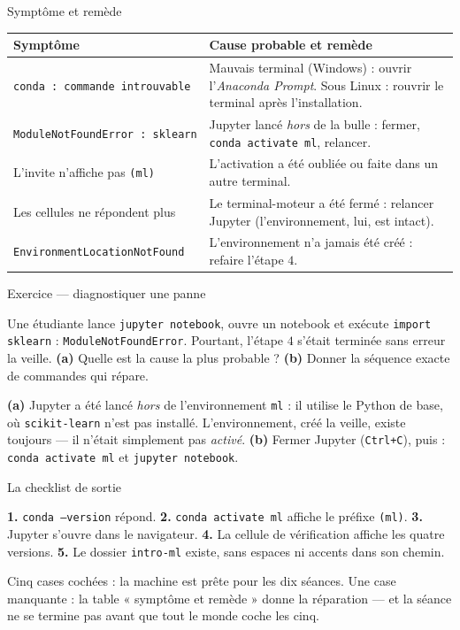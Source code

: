 \documentclass[aspectratio=169,11pt]{beamer}
\begin{document}
\begin{frame}{Symptôme et remède}
\begin{center}\small \renewcommand{\arraystretch}{1.3}
\begin{tabular}{p{5.4cm} p{6.6cm}}
\textbf{Symptôme} & \textbf{Cause probable et remède}\\\hline
\texttt{conda~:~commande introuvable} & Mauvais terminal (Windows) : ouvrir l'\emph{Anaconda Prompt}. Sous Linux : rouvrir le terminal après l'installation.\\
\texttt{ModuleNotFoundError~:~sklearn} & Jupyter lancé \emph{hors} de la bulle : fermer, \texttt{conda activate ml}, relancer.\\
L'invite n'affiche pas \texttt{(ml)} & L'activation a été oubliée ou faite dans un autre terminal.\\
Les cellules ne répondent plus & Le terminal-moteur a été fermé : relancer Jupyter (l'environnement, lui, est intact).\\
\texttt{EnvironmentLocationNotFound} & L'environnement n'a jamais été créé : refaire l'étape $4$.\\
\end{tabular}\end{center}
\end{frame}

\begin{frame}{Exercice — diagnostiquer une panne}
\begin{ucadrec}[Énoncé]
{\small Une étudiante lance \texttt{jupyter notebook}, ouvre un notebook et exécute \texttt{import sklearn} : \texttt{ModuleNotFoundError}. Pourtant, l'étape $4$ s'était terminée sans erreur la veille. \textbf{(a)} Quelle est la cause la plus probable ? \textbf{(b)} Donner la séquence exacte de commandes qui répare.}
\end{ucadrec}
\pause
\begin{ucadex}[Correction]
{\small \textbf{(a)} Jupyter a été lancé \emph{hors} de l'environnement \texttt{ml} : il utilise le Python de base, où \texttt{scikit-learn} n'est pas installé. L'environnement, créé la veille, existe toujours — il n'était simplement pas \emph{activé}. \textbf{(b)} Fermer Jupyter (\texttt{Ctrl+C}), puis : \texttt{conda activate ml} et \texttt{jupyter notebook}.}
\end{ucadex}
\end{frame}

\begin{frame}{La checklist de sortie}
\begin{ucadret}
{\small \textbf{1.} \texttt{conda --version} répond. \;\textbf{2.} \texttt{conda activate ml} affiche le préfixe \texttt{(ml)}. \;\textbf{3.} Jupyter s'ouvre dans le navigateur. \;\textbf{4.} La cellule de vérification affiche les quatre versions. \;\textbf{5.} Le dossier \texttt{intro-ml} existe, sans espaces ni accents dans son chemin.}
\end{ucadret}
{\small Cinq cases cochées : la machine est prête pour les dix séances. Une case manquante : la table « symptôme et remède » donne la réparation — et la séance ne se termine pas avant que tout le monde coche les cinq.}
\end{frame}
\end{document}
